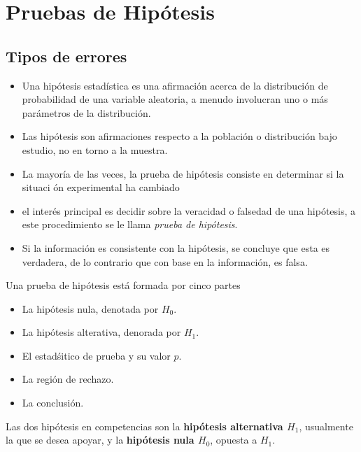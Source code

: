 \section{Pruebas de Hip\'otesis}
\subsection*{Tipos de errores}

\begin{itemize}
\item Una hip\'otesis estad\'istica es una afirmaci\'on  acerca de la distribuci\'on de probabilidad de una variable aleatoria, a menudo involucran uno o m\'as par\'ametros de la distribuci\'on.

\item Las hip\'otesis son afirmaciones respecto a la poblaci\'on o distribuci\'on bajo estudio, no en torno a la muestra.

\item La mayor\'ia de las veces, la prueba de hip\'otesis consiste en determinar si la situaci \'on experimental ha cambiado

\item el inter\'es principal es decidir sobre la veracidad o falsedad de una hip\'otesis, a este procedimiento se le llama \textit{prueba de hip\'otesis}.

\item Si la informaci\'on es consistente con la hip\'otesis, se concluye que esta es verdadera, de lo contrario que con base en la informaci\'on, es falsa.

\end{itemize}

Una prueba de hip\'otesis est\'a formada por cinco partes
\begin{itemize}
\item La hip\'otesis nula, denotada por $H_{0}$.
\item La hip\'otesis alterativa, denorada por $H_{1}$.
\item El estad\'sitico de prueba y su valor $p$.
\item La regi\'on de rechazo.
\item La conclusi\'on.
\end{itemize}

\begin{Def}
Las dos hip\'otesis en competencias son la \textbf{hip\'otesis alternativa $H_{1}$}, usualmente la que se desea apoyar, y la \textbf{hip\'otesis nula $H_{0}$}, opuesta a $H_{1}$.
\end{Def}

